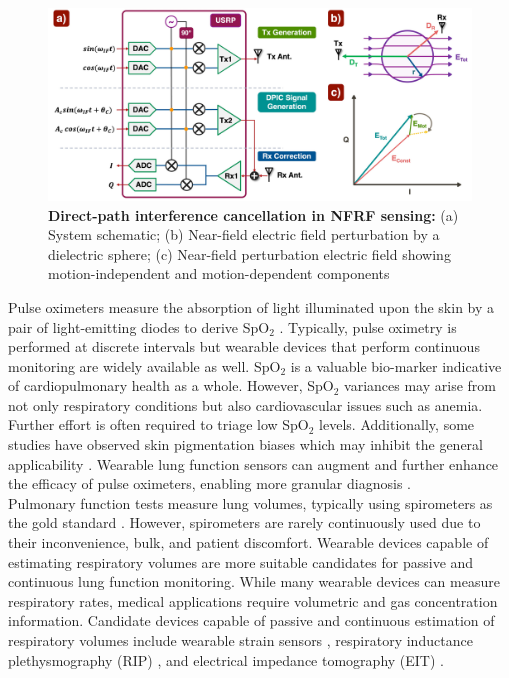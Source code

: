\documentclass[journal,twoside,web]{ieeecolor}
\begin{document}
\begin{figure}[t]
\centering
\includegraphics[width=.95\textwidth]{setup_dpic_v3.jpg}
\caption{\textbf{Direct-path interference cancellation in NFRF sensing:} (a) System schematic; (b) Near-field electric field perturbation by a dielectric sphere; (c) Near-field perturbation electric field showing motion-independent and motion-dependent components}
\label{fig:dpic}
\end{figure}
\hspace{-0.5em}Pulse oximeters measure the absorption of light illuminated upon the skin by a pair of light-emitting diodes to derive SpO$_2$ \cite{jubranPulseOximetry2015}. Typically, pulse oximetry is performed at discrete intervals but wearable devices that perform continuous monitoring are widely available as well. SpO$_2$ is a valuable bio-marker indicative of cardiopulmonary health as a whole. However, SpO$_2$ variances may arise from not only respiratory conditions but also cardiovascular issues such as anemia. Further effort is often required to triage low SpO$_2$ levels. Additionally, some studies have observed skin pigmentation biases which may inhibit the general applicability \cite{cabanasSkinPigmentationInfluence2022}. Wearable lung function sensors can augment and further enhance the efficacy of pulse oximeters, enabling more granular diagnosis \cite{buekersWearableFingerPulse2019}\cite{buekersOxygenSaturationMeasurements2018}. \\
Pulmonary function tests measure lung volumes, typically using spirometers as the gold standard \cite{poncePulmonaryFunctionTests2024}. However, spirometers are rarely continuously used due to their inconvenience, bulk, and patient discomfort. Wearable devices capable of estimating respiratory volumes are more suitable candidates for passive and continuous lung function monitoring. While many wearable devices can measure respiratory rates, medical applications require volumetric and gas concentration information. Candidate devices capable of passive and continuous estimation of respiratory volumes include wearable strain sensors \cite{chuRespirationRateVolume2019}, respiratory inductance plethysmography (RIP) \cite{vitazkovaAdvancesRespiratoryMonitoring2024}, and electrical impedance tomography (EIT) \cite{adlerMonitoringChangesLung1997}. \\
\end{document}

